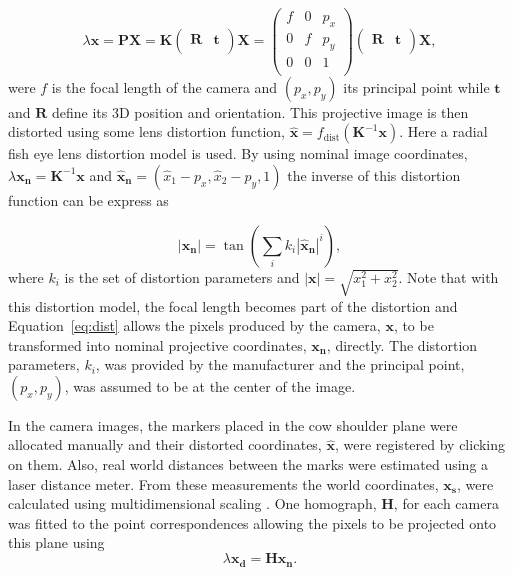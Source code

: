 \documentclass{cta-author}
\begin{document}
\begin{equation}
	\lambda \bm x = \bm P \bm X = \bm K \left(
	\begin{array}{cc}
		\bm R & \bm t \\
	\end{array}
	\right) \bm X =
	\left(
	\begin{array}{ccc}
		f & 0 & p_x  \\
		0 & f & p_y  \\
		0 & 0 & 1  \\
	\end{array}
	\right)
	\left(
	\begin{array}{cc}
		\bm R & \bm t \\
	\end{array}
	\right) \bm X,	
\end{equation}
were $f$ is the focal length of the camera and $\left(p_x, p_y\right)$ its principal point while $\bm t$ and
$\bm R$  define its 3D position and orientation. This projective image is then distorted using some lens
distortion function, $\bm{\hat x} = f_\text{dist}\left(\bm K^{-1}\bm x\right)$. Here a radial fish eye lens
distortion model is used. By using nominal image coordinates,
$\lambda \bm {x_n} =\bm K^{-1} \bm x$ and
$\bm {\hat x_n} = \left(\hat x_1 - p_x, \hat x_2 - p_y, 1\right)$ the inverse of this distortion function can
be express as

\begin{equation}
	\left| \bm {x_n} \right| = \tan \left( \sum_i k_i \left| \bm {\hat x_n} \right|^i \right)
	\label{eq:dist} ,
\end{equation}
where $k_i$ is the set of distortion parameters and
$\left| \bm x \right| = \sqrt{x_1^2 + x_2^2}$.
Note that with this distortion model, the focal length becomes part of the distortion and
Equation~\ref{eq:dist} allows the pixels produced by the camera, $\bm x$, to be transformed into nominal
projective coordinates, $\bm {x_n}$, directly. The distortion parameters, $k_i$, was provided by the
manufacturer and the principal point, $\left(p_x, p_y\right)$,  was assumed to be at the center of the image.

In the camera images, the markers placed in the cow shoulder plane were allocated manually and their distorted
coordinates, $\bm {\hat x}$, were registered by clicking on them. Also, real world distances between the
marks were estimated using a laser distance meter. From these measurements the world coordinates, $\bm
{x_s}$, were calculated using multidimensional scaling \cite{Young1938}. One homograph, $\bm H$, for each
camera was fitted to the point correspondences allowing the pixels to be projected onto this plane using
\begin{equation}
\lambda \bm {x_d} = \bm H \bm {x_n} .
\end{equation}
\end{document}

